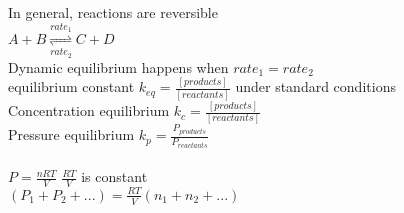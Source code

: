 \documentclass[12pt]{article}
\begin{document}
In general, reactions are reversible \\
	   $A + B \overset{rate_1}{\underset{rate_2}{\rightleftharpoons}} C + D$ \\
Dynamic equilibrium happens when $rate_1 = rate_2$ \\
equilibrium constant $k_{eq} = \frac{[products]}{[reactants]}$ \qquad under standard conditions \\
Concentration equilibrium $k_c = \frac{[products]}{[reactants]}$ \\
Pressure equilibrium $k_p = \frac{P_{products}}{P_{reactants}}$ \\\\
$P=\frac{nRT}{V}$ \qquad $\frac{RT}{V}$ is constant \\
$\left(P_1 + P_2 + ...\right) = \frac{RT}{V}\left(n_1 + n_2 + ...\right)$
\end{document}
